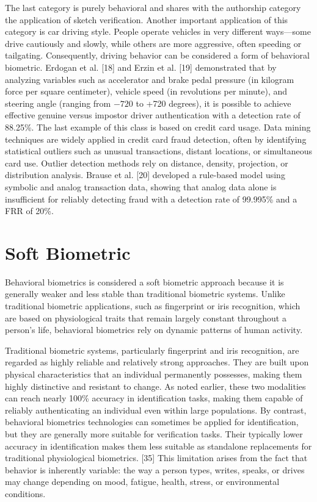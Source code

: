 \documentclass[12pt]{report}
\begin{document}
The last category is purely behavioral and shares with the authorship category the application of sketch verification.
Another important application of this category is car driving style.
People operate vehicles in very different ways—some drive cautiously and slowly, while others are more aggressive, often speeding or tailgating. 
Consequently, driving behavior can be considered a form of behavioral biometric. 
Erdogan et al. [18] and Erzin et al. [19] demonstrated that by analyzing variables such as accelerator and brake pedal pressure (in kilogram force per square centimeter), vehicle speed (in revolutions per minute), and steering angle (ranging from \(-720\) to +720 degrees), it is possible to achieve effective genuine versus impostor driver authentication with a detection rate of 88.25\%.
The last example of this class is based on credit card usage.
Data mining techniques are widely applied in credit card fraud detection, often by identifying statistical outliers such as unusual transactions, distant locations, or simultaneous card use. 
Outlier detection methods rely on distance, density, projection, or distribution analysis. 
Brause et al. [20] developed a rule-based model using symbolic and analog transaction data, showing that analog data alone is insufficient for reliably detecting fraud with a detection rate of 99.995\% and a FRR of 20\%.

\section{Soft Biometric}

Behavioral biometrics is considered a soft biometric approach because it is generally weaker and less stable than traditional biometric systems. 
Unlike traditional biometric applications, such as fingerprint or iris recognition, which are based on physiological traits that remain largely constant throughout a person's life, behavioral biometrics rely on dynamic patterns of human activity.

Traditional biometric systems, particularly fingerprint and iris recognition, are regarded as highly reliable and relatively strong approaches. 
They are built upon physical characteristics that an individual permanently possesses, making them highly distinctive and resistant to change. 
As noted earlier, these two modalities can reach nearly 100\% accuracy in identification tasks, making them capable of reliably authenticating an individual even within large populations.
\sloppy
By contrast, behavioral biometrics technologies can sometimes be applied for identification, but they are generally more suitable for verification tasks. 
\fussy
Their typically lower accuracy in identification makes them less suitable as standalone replacements for traditional physiological biometrics. [35]
This limitation arises from the fact that behavior is inherently variable: the way a person types, writes, speaks, or drives may change depending on mood, fatigue, health, stress, or environmental conditions.
\end{document}
